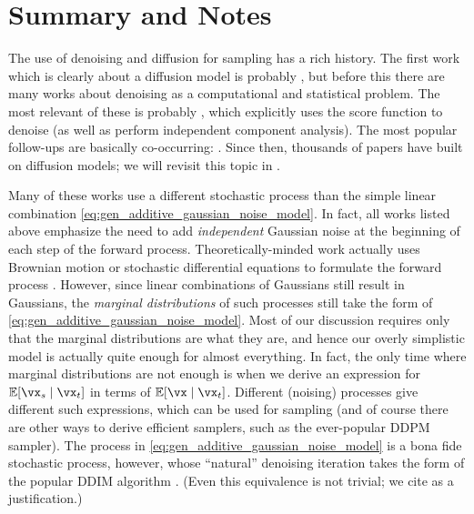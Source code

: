 \documentclass[../../book-main.tex]{subfiles}
\begin{document}

\section{Summary and Notes}

The use of denoising and diffusion for sampling has a rich history. The first work which is clearly about a diffusion model is probably \cite{Sohl-Dickstein2015}, but before this there are many works about denoising as a computational and statistical problem. The most relevant of these is probably \cite{hyvarinen05a}, which explicitly uses the score function to denoise (as well as perform independent component analysis). The most popular follow-ups are basically co-occurring: \cite{ho2020denoising,song2019}. Since then, thousands of papers have built on diffusion models; we will revisit this topic in .

Many of these works use a different stochastic process than the simple linear combination \eqref{eq:gen_additive_gaussian_noise_model}. In fact, all works listed above emphasize the need to add \textit{independent} Gaussian noise at the beginning of each step of the forward process. Theoretically-minded work actually uses Brownian motion or stochastic differential equations to formulate the forward process \cite{song2020score}. However, since linear combinations of Gaussians still result in Gaussians, the \textit{marginal distributions} of such processes still take the form of \eqref{eq:gen_additive_gaussian_noise_model}. Most of our discussion requires only that the marginal distributions are what they are, and hence our overly simplistic model is actually quite enough for almost everything. In fact, the only time where marginal distributions are not enough is when we derive an expression for \(\Ex[\vx_{s} \mid \vx_{t}]\) in terms of \(\Ex[\vx \mid \vx_{t}]\). Different (noising) processes give different such expressions, which can be used for sampling (and of course there are other ways to derive efficient samplers, such as the ever-popular DDPM sampler). The process in \eqref{eq:gen_additive_gaussian_noise_model} is a bona fide stochastic process, however, whose ``natural'' denoising iteration takes the form of the popular DDIM algorithm \cite{song2020denoising}. (Even this equivalence is not trivial; we cite \cite{de2025distributional} as a justification.) 
\end{document}
